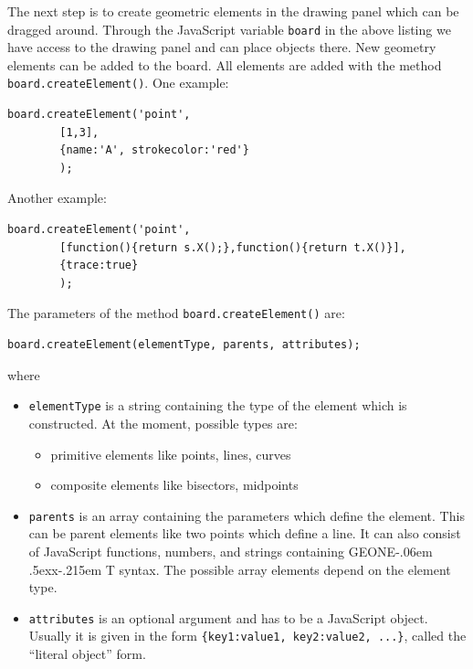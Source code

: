 \documentclass[a4paper]{tufte-book}
\def\geonext{GEONE\kern-.06em \lower.5ex\hbox{x}\kern-.215em T}
\begin{document}
The next step is to create geometric elements in the drawing panel which can be 
dragged around.
Through the JavaScript variable \lstinline|board| in the above listing we have access to the drawing panel 
and can place objects there. New geometry elements can be added to the board. 
All elements are added with the method \lstinline|board.createElement()|. One example:
\begin{lstlisting}
board.createElement('point', 
        [1,3], 
        {name:'A', strokecolor:'red'}
        );
\end{lstlisting}
Another example:
\begin{lstlisting}
board.createElement('point', 
        [function(){return s.X();},function(){return t.X()}], 
        {trace:true}
        );
\end{lstlisting}
The parameters of the method \lstinline|board.createElement()| are:
\begin{lstlisting}
board.createElement(elementType, parents, attributes);
\end{lstlisting}
where
\begin{itemize}
    \item \lstinline|elementType| is a string containing the type of the element which is constructed. 
       At the moment, possible types are:
        \begin{itemize}
          \item primitive elements like points, lines, curves
          \item composite elements like bisectors, midpoints 
        \end{itemize}
    \item \lstinline|parents| is an array containing the parameters which define the element. 
    This can be parent elements like two points which define a line. It can also consist of JavaScript functions, numbers, and strings containing \geonext{} syntax. The possible array elements depend on the element type.
    \item \lstinline|attributes| is an optional argument and has to be a JavaScript object. 
    Usually it is given in the form 
    \lstinline|{key1:value1, key2:value2, ...}|, called the ``literal object'' form.
\end{itemize}
\end{document}
